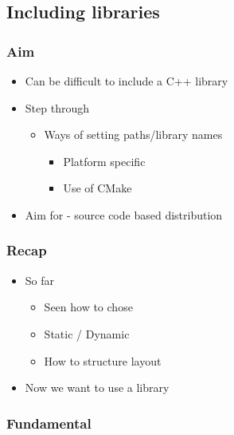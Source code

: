 \subsection{Including libraries}\label{including-libraries}

\subsubsection{Aim}\label{aim-2}

\begin{itemize}
\itemsep1pt\parskip0pt
\item
  Can be difficult to include a C++ library
\item
  Step through

  \begin{itemize}
  \itemsep1pt\parskip0pt
  \item
    Ways of setting paths/library names

    \begin{itemize}
    \itemsep1pt\parskip0pt
    \item
      Platform specific
    \item
      Use of CMake
    \end{itemize}
  \end{itemize}
\item
  Aim for - source code based distribution
\end{itemize}

\subsubsection{Recap}\label{recap}

\begin{itemize}
\itemsep1pt\parskip0pt
\item
  So far

  \begin{itemize}
  \itemsep1pt\parskip0pt
  \item
    Seen how to chose
  \item
    Static / Dynamic
  \item
    How to structure layout
  \end{itemize}
\item
  Now we want to use a library
\end{itemize}

\subsubsection{Fundamental}\label{fundamental}

